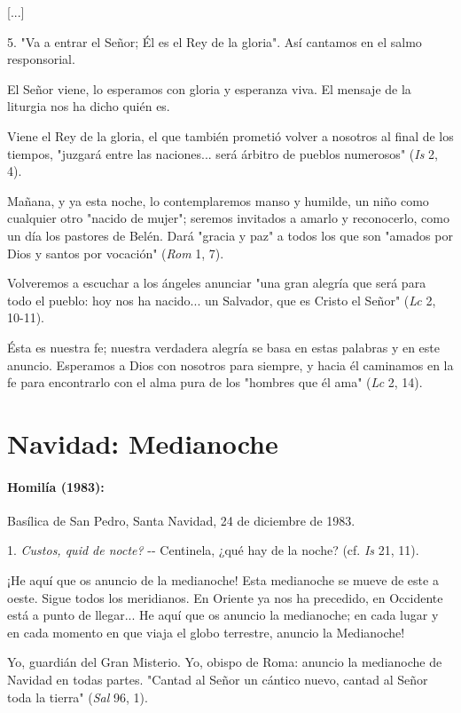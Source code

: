 {[}...{]}

5. "Va a entrar el Señor; Él es el Rey de la gloria". Así cantamos en el
salmo responsorial.

El Señor viene, lo esperamos con gloria y esperanza viva. El mensaje de
la liturgia nos ha dicho quién es.

Viene el Rey de la gloria, el que también prometió volver a nosotros al
final de los tiempos, "juzgará entre las naciones... será árbitro de
pueblos numerosos" (\emph{Is} 2, 4).

Mañana, y ya esta noche, lo contemplaremos manso y humilde, un niño como
cualquier otro "nacido de mujer"; seremos invitados a amarlo y
reconocerlo, como un día los pastores de Belén. Dará "gracia y paz" a
todos los que son "amados por Dios y santos por vocación" (\emph{Rom} 1,
7).

Volveremos a escuchar a los ángeles anunciar "una gran alegría que será
para todo el pueblo: hoy nos ha nacido... un Salvador, que es Cristo el
Señor" (\emph{Lc} 2, 10-11).

Ésta es nuestra fe; nuestra verdadera alegría se basa en estas palabras
y en este anuncio. Esperamos a Dios con nosotros para siempre, y hacia
él caminamos en la fe para encontrarlo con el alma pura de los "hombres
que él ama" (\emph{Lc} 2, 14).



\chapter{Navidad: Medianoche}

\subsubsection{Homilía (1983): }

Basílica de San Pedro, Santa Navidad, 24 de diciembre de 1983.

1. \emph{Custos, quid de nocte?} -\/- Centinela, ¿qué hay de la noche?
(cf. \emph{Is} 21, 11).

¡He aquí que os anuncio de la medianoche! Esta medianoche se mueve de
este a oeste. Sigue todos los meridianos. En Oriente ya nos ha
precedido, en Occidente está a punto de llegar... He aquí que os anuncio
la medianoche; en cada lugar y en cada momento en que viaja el globo
terrestre, anuncio la Medianoche!

Yo, guardián del Gran Misterio. Yo, obispo de Roma: anuncio la
medianoche de Navidad en todas partes. "Cantad al Señor un cántico
nuevo, cantad al Señor toda la tierra" (\emph{Sal} 96, 1).

